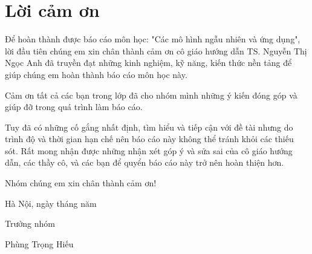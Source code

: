 \documentclass[12pt,a4paper,oneside]{book}
\newcommand{\teachername}{TS. Nguyễn Thị Ngọc Anh}
\begin{document}
\renewcommand{\listfigurename}{Danh mục hình vẽ}
\listoffigures

\chapter{Lời cảm ơn}
Để hoàn thành được báo cáo môn học: "Các mô hình ngẫu nhiên và ứng dụng",
lời đầu tiên chúng em xin chân thành cảm ơn cô giáo hướng dẫn \teachername\space
đã truyền đạt những kinh nghiệm, kỹ năng, kiến thức nền tảng
để giúp chúng em hoàn thành báo cáo môn học này.



Cảm ơn tất cả các bạn trong lớp
đã cho nhóm mình những ý kiến đóng góp và giúp đỡ trong quá trình làm báo cáo.

Tuy đã có những cố gắng nhất định, tìm hiểu và tiếp cận với đề tài
nhưng do trình độ và thời gian hạn chế
nên báo cáo này không thể tránh khỏi các thiếu sót.
Rất mong nhận được những nhận xét góp ý và sửa sai của cô giáo hướng dẫn,
các thầy cô, và các bạn để quyển báo cáo này trở nên hoàn thiện hơn.

Nhóm chúng em xin chân thành cảm ơn!

\hfill
\begin{minipage}[t]{0.48\textwidth}
	\begin{center}
		Hà Nội, ngày \the\day\space tháng \the\month\space năm \the\year\par
		Trưởng nhóm\par
		Phùng Trọng Hiếu
	\end{center}
\end{minipage}

\tableofcontents

\mainmatter













\backmatter

% 

\printbibliography[heading=bibintoc]
\end{document}

